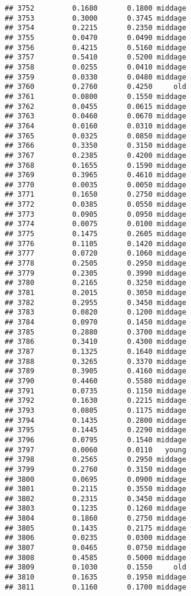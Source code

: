 \documentclass[
]{article}
\begin{document}
\begin{verbatim}
## 3752         0.1680       0.1800 middage
## 3753         0.3000       0.3745 middage
## 3754         0.2215       0.2350 middage
## 3755         0.0470       0.0490 middage
## 3756         0.4215       0.5160 middage
## 3757         0.5410       0.5200 middage
## 3758         0.0255       0.0410 middage
## 3759         0.0330       0.0480 middage
## 3760         0.2760       0.4250     old
## 3761         0.0800       0.1550 middage
## 3762         0.0455       0.0615 middage
## 3763         0.0460       0.0670 middage
## 3764         0.0160       0.0310 middage
## 3765         0.0325       0.0850 middage
## 3766         0.3350       0.3150 middage
## 3767         0.2385       0.4200 middage
## 3768         0.1655       0.1590 middage
## 3769         0.3965       0.4610 middage
## 3770         0.0035       0.0050 middage
## 3771         0.1650       0.2750 middage
## 3772         0.0385       0.0550 middage
## 3773         0.0905       0.0950 middage
## 3774         0.0075       0.0100 middage
## 3775         0.1475       0.2605 middage
## 3776         0.1105       0.1420 middage
## 3777         0.0720       0.1060 middage
## 3778         0.2505       0.2950 middage
## 3779         0.2305       0.3990 middage
## 3780         0.2165       0.3250 middage
## 3781         0.2015       0.3050 middage
## 3782         0.2955       0.3450 middage
## 3783         0.0820       0.1200 middage
## 3784         0.0970       0.1450 middage
## 3785         0.2880       0.3700 middage
## 3786         0.3410       0.4300 middage
## 3787         0.1325       0.1640 middage
## 3788         0.3265       0.3370 middage
## 3789         0.3905       0.4160 middage
## 3790         0.4460       0.5580 middage
## 3791         0.0735       0.1150 middage
## 3792         0.1630       0.2215 middage
## 3793         0.0805       0.1175 middage
## 3794         0.1435       0.2800 middage
## 3795         0.1445       0.2290 middage
## 3796         0.0795       0.1540 middage
## 3797         0.0060       0.0110   young
## 3798         0.2565       0.2950 middage
## 3799         0.2760       0.3150 middage
## 3800         0.0695       0.0900 middage
## 3801         0.2115       0.3550 middage
## 3802         0.2315       0.3450 middage
## 3803         0.1235       0.1260 middage
## 3804         0.1860       0.2750 middage
## 3805         0.1435       0.2175 middage
## 3806         0.0235       0.0300 middage
## 3807         0.0465       0.0750 middage
## 3808         0.4585       0.5000 middage
## 3809         0.1030       0.1550     old
## 3810         0.1635       0.1950 middage
## 3811         0.1160       0.1700 middage

\end{verbatim}
\end{document}
